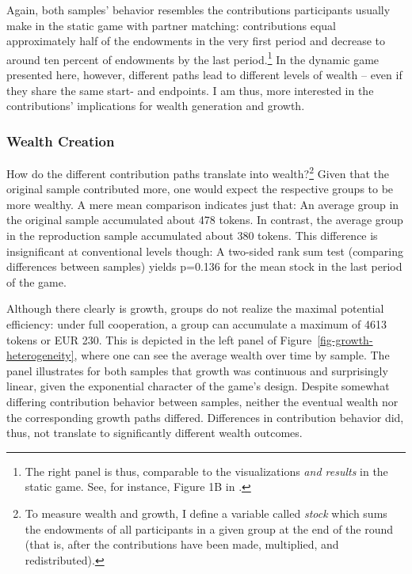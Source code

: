 \documentclass[
  authoryear,
  review,
  3p,
  onecolumn]{elsarticle}
\begin{document}
Again, both samples' behavior resembles the contributions participants
usually make in the static game with partner matching: contributions
equal approximately half of the endowments in the very first period and
decrease to around ten percent of endowments by the last
period.\footnote{The right panel is thus, comparable to the
  visualizations \emph{and results} in the static game. See, for
  instance, Figure 1B in \citet[p.986]{fehrgaechter2000}.} In the
dynamic game presented here, however, different paths lead to different
levels of wealth -- even if they share the same start- and endpoints. I
am thus, more interested in the contributions' implications for wealth
generation and growth.

\hypertarget{sec-wealth}{%
\subsubsection{Wealth Creation}\label{sec-wealth}}

How do the different contribution paths translate into
wealth?\footnote{To measure wealth and growth, I define a variable
  called \emph{stock} which sums the endowments of all participants in a
  given group at the end of the round (that is, after the contributions
  have been made, multiplied, and redistributed).} Given that the
original sample contributed more, one would expect the respective groups
to be more wealthy. A mere mean comparison indicates just that: An
average group in the original sample accumulated about 478 tokens. In
contrast, the average group in the reproduction sample accumulated about
380 tokens. This difference is insignificant at conventional levels
though: A two-sided rank sum test (comparing differences between
samples) yields p=0.136 for the mean stock in the last period of the
game.

Although there clearly is growth, groups do not realize the maximal
potential efficiency: under full cooperation, a group can accumulate a
maximum of 4613 tokens or EUR 230. This is depicted in the left panel of
Figure~\ref{fig-growth-heterogeneity}, where one can see the average
wealth over time by sample. The panel illustrates for both samples that
growth was continuous and surprisingly linear, given the exponential
character of the game's design. Despite somewhat differing contribution
behavior between samples, neither the eventual wealth nor the
corresponding growth paths differed. Differences in contribution
behavior did, thus, not translate to significantly different wealth
outcomes.
\end{document}
